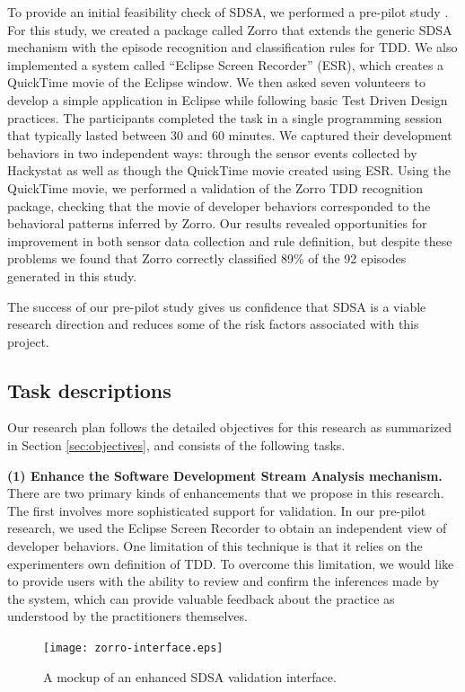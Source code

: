 To provide an initial feasibility check of SDSA, we performed a pre-pilot
study \cite{csdl2-06-02}. For this study, we created a package called Zorro
that extends the generic SDSA mechanism with the episode recognition and
classification rules for TDD.  We also implemented a system called
``Eclipse Screen Recorder'' (ESR), which creates a QuickTime movie of the
Eclipse window.  We then asked seven volunteers to develop a simple
application in Eclipse while following basic Test Driven Design practices.
The participants completed the task in a single programming session that
typically lasted between 30 and 60 minutes. We captured their development
behaviors in two independent ways: through the sensor events collected by
Hackystat as well as though the QuickTime movie created using ESR.  Using
the QuickTime movie, we performed a validation of the Zorro TDD recognition
package, checking that the movie of developer behaviors corresponded to the
behavioral patterns inferred by Zorro.  Our results revealed opportunities
for improvement in both sensor data collection and rule definition, but
despite these problems we found that Zorro correctly classified 89\% of the
92 episodes generated in this study.

The success of our pre-pilot study gives us confidence that SDSA is a
viable research direction and reduces some of the risk factors associated
with this project.

\subsection{Task descriptions}

Our research plan follows the detailed objectives for this research as
summarized in Section \ref{sec:objectives}, and consists of the following tasks.

{\bf (1) Enhance the Software Development Stream Analysis mechanism.} 
There are two primary kinds of enhancements that we propose in this research.
The first involves more sophisticated support for validation.   In our pre-pilot 
research, we used the Eclipse Screen Recorder to obtain an independent view of 
developer behaviors.  One limitation of this technique is that it relies on the
experimenters own definition of TDD.  To overcome this limitation, we would like to provide
users with the ability to review and confirm the inferences made by the system, 
which can provide valuable feedback about the practice as understood by the 
practitioners themselves.  

\begin{figure}[ht]
  \centering
  \texttt{[image: zorro-interface.eps]}
  \caption{A mockup of an enhanced SDSA validation interface.}
  \label{fig:zorro}
\end{figure}

